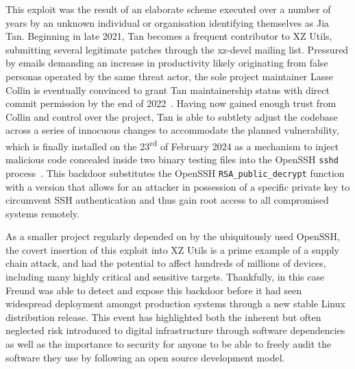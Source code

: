 \documentclass[a4paper,oneside,12pt]{article}
\begin{document}
This exploit was the result of an elaborate scheme executed over a number of years by an unknown individual or organisation identifying themselves as Jia Tan. Beginning in late 2021, Tan becomes a frequent contributor to XZ Utils, submitting several legitimate patches through the xz-devel mailing list. Pressured by emails demanding an increase in productivity likely originating from false personas operated by the same threat actor, the sole project maintainer Lasse Collin is eventually convinced to grant Tan maintainership status with direct commit permission by the end of 2022~\cite{collin-email}. Having now gained enough trust from Collin and control over the project, Tan is able to subtlety adjust the codebase across a series of innocuous changes to accommodate the planned vulnerability, which is finally installed on the 23\textsuperscript{rd} of February 2024 as a mechanism to inject malicious code concealed inside two binary testing files into the OpenSSH \verb|sshd| process~\cite{commit-cf44e4b}. This backdoor substitutes the OpenSSH \verb|RSA_public_decrypt| function with a version that allows for an attacker in possession of a specific private key to circumvent SSH authentication and thus gain root access to all compromised systems remotely.

As a smaller project regularly depended on by the ubiquitously used OpenSSH, the covert insertion of this exploit into XZ Utils is a prime example of a supply chain attack, and had the potential to affect hundreds of millions of devices, including many highly critical and sensitive targets. Thankfully, in this case Freund was able to detect and expose this backdoor before it had seen widespread deployment amongst production systems through a new stable Linux distribution release. This event has highlighted both the inherent but often neglected risk introduced to digital infrastructure through software dependencies as well as the importance to security for anyone to be able to freely audit the software they use by following an open source development model.

\printbibliography
\end{document}
